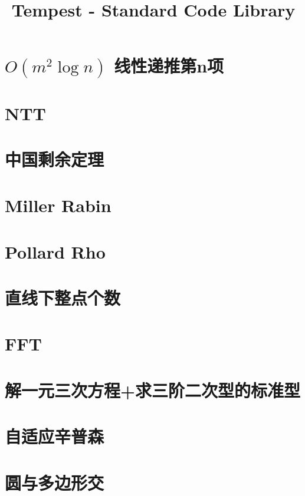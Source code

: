 \documentclass[landscape, twocolumn, 8pt, a4paper, twoside]{extarticle}
\title{Tempest - Standard Code Library}
\begin{document}
\section{$O(m^2\log n)$ 线性递推第n项}
	
\section{NTT}
	
\section{中国剩余定理}
	
\section{Miller Rabin}
	
\section{Pollard Rho}
	
\section{直线下整点个数}
	

\section{FFT}
	
\section{解一元三次方程+求三阶二次型的标准型}
	
\section{自适应辛普森}
	

\section{圆与多边形交}
	
\end{document}
